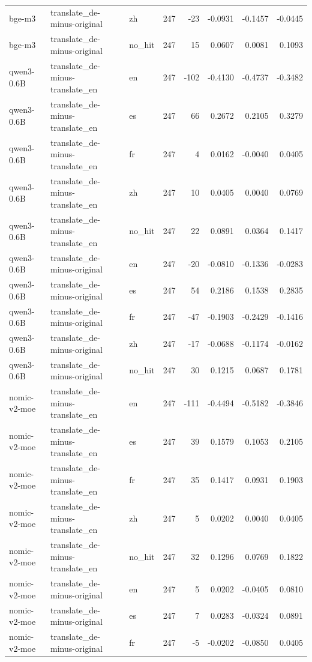 \begin{tabular}{lllrrrrr}
bge-m3 & translate\_de-minus-original & zh & 247 & -23 & -0.0931 & -0.1457 & -0.0445 \\
bge-m3 & translate\_de-minus-original & no\_hit & 247 & 15 & 0.0607 & 0.0081 & 0.1093 \\
qwen3-0.6B & translate\_de-minus-translate\_en & en & 247 & -102 & -0.4130 & -0.4737 & -0.3482 \\
qwen3-0.6B & translate\_de-minus-translate\_en & es & 247 & 66 & 0.2672 & 0.2105 & 0.3279 \\
qwen3-0.6B & translate\_de-minus-translate\_en & fr & 247 & 4 & 0.0162 & -0.0040 & 0.0405 \\
qwen3-0.6B & translate\_de-minus-translate\_en & zh & 247 & 10 & 0.0405 & 0.0040 & 0.0769 \\
qwen3-0.6B & translate\_de-minus-translate\_en & no\_hit & 247 & 22 & 0.0891 & 0.0364 & 0.1417 \\
qwen3-0.6B & translate\_de-minus-original & en & 247 & -20 & -0.0810 & -0.1336 & -0.0283 \\
qwen3-0.6B & translate\_de-minus-original & es & 247 & 54 & 0.2186 & 0.1538 & 0.2835 \\
qwen3-0.6B & translate\_de-minus-original & fr & 247 & -47 & -0.1903 & -0.2429 & -0.1416 \\
qwen3-0.6B & translate\_de-minus-original & zh & 247 & -17 & -0.0688 & -0.1174 & -0.0162 \\
qwen3-0.6B & translate\_de-minus-original & no\_hit & 247 & 30 & 0.1215 & 0.0687 & 0.1781 \\
nomic-v2-moe & translate\_de-minus-translate\_en & en & 247 & -111 & -0.4494 & -0.5182 & -0.3846 \\
nomic-v2-moe & translate\_de-minus-translate\_en & es & 247 & 39 & 0.1579 & 0.1053 & 0.2105 \\
nomic-v2-moe & translate\_de-minus-translate\_en & fr & 247 & 35 & 0.1417 & 0.0931 & 0.1903 \\
nomic-v2-moe & translate\_de-minus-translate\_en & zh & 247 & 5 & 0.0202 & 0.0040 & 0.0405 \\
nomic-v2-moe & translate\_de-minus-translate\_en & no\_hit & 247 & 32 & 0.1296 & 0.0769 & 0.1822 \\
nomic-v2-moe & translate\_de-minus-original & en & 247 & 5 & 0.0202 & -0.0405 & 0.0810 \\
nomic-v2-moe & translate\_de-minus-original & es & 247 & 7 & 0.0283 & -0.0324 & 0.0891 \\
nomic-v2-moe & translate\_de-minus-original & fr & 247 & -5 & -0.0202 & -0.0850 & 0.0405 \\

\end{tabular}
